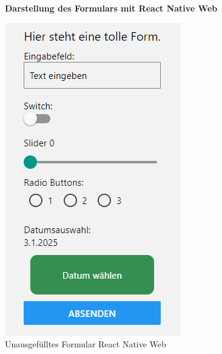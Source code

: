 \begin{figure}[H]
    \centering
    \textbf{Darstellung des Formulars mit React Native Web}\par\vspace{0.5cm}
    \begin{minipage}{0.45\textwidth}
        \centering
        \includegraphics[width=\linewidth]{images/form/web/react_native/form.png}
        \caption{Unausgefülltes Formular React Native Web}
    \end{minipage}

\end{figure}
